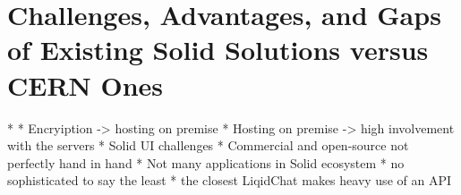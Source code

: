 \section{Challenges, Advantages, and Gaps of Existing Solid Solutions versus CERN Ones}

* 
* Encryiption -> hosting on premise
* Hosting on premise -> high involvement with the servers
* Solid UI challenges
* Commercial and open-source not perfectly hand in hand
* Not many applications in Solid ecosystem
    * no sophisticated to say the least
    * the closest LiqidChat makes heavy use of an API